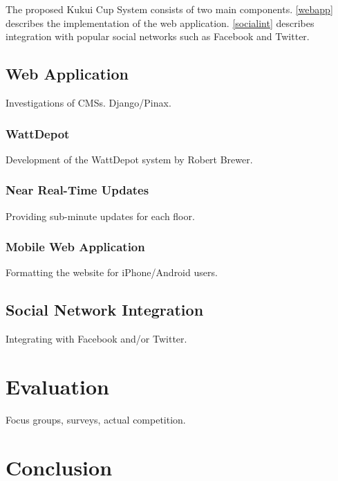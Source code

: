 The proposed Kukui Cup System consists of two main components.  \autoref{webapp} describes the implementation of the web application.  \autoref{socialint} describes integration with popular social networks such as Facebook and Twitter.

\section{Web Application}
\label{webapp}

Investigations of CMSs.  Django/Pinax.

\subsection{WattDepot}

Development of the WattDepot system by Robert Brewer.

\subsection{Near Real-Time Updates}

Providing sub-minute updates for each floor.

\subsection{Mobile Web Application}

Formatting the website for iPhone/Android users.

\section{Social Network Integration}
\label{socialint}

Integrating with Facebook and/or Twitter.


\chapter{Evaluation}
\label{evaluation}

Focus groups, surveys, actual competition.

\chapter{Conclusion}
\label{conclusion}

